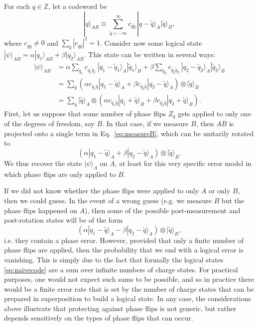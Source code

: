\documentclass[11pt,english]{article}
\newcommand{\ket}[1]{|#1\rangle}
\begin{document}
For each $q \in \mathbb{Z}$, let a codeword be
\begin{equation} \label{eq:naivecode}
\ket{q}_{AB} \equiv \sum_{\tilde q = -\infty}^{\infty} c_{q \tilde q} \, \ket{q-\tilde q}_A \ket{\tilde q}_B,
\end{equation}
where $c_{q\tilde q}\neq 0$ and $\sum_{\tilde q} |c_{q \tilde q}|^2 = 1$.
Consider now some logical state $\ket{\psi}_{AB} = \alpha \ket{q_1}_{AB} + \beta \ket{q_2}_{AB}$.
This state can be written in several ways:
\begin{align}
\ket{\psi}_{AB} &= \alpha \sum_{\tilde q_1} c_{q_1 \tilde q_1} \, \ket{q_1-\tilde q_1}_A \ket{\tilde q_1}_B + \beta \sum_{\tilde q_2} c_{q_2 \tilde q_2} \, \ket{q_2-\tilde q_2}_A \ket{\tilde q_2}_B \label{eq:totalstate} \\
&= \sum_{\tilde q} \left( \alpha c_{q_1 \tilde q} \ket{q_1 - \tilde q}_A + \beta c_{q_2 \tilde q} \ket{q_2 - \tilde q}_A \right) \otimes \ket{\tilde q}_B \label{eq:measureB} \\
&= \sum_{\tilde q} \ket{\tilde q}_A \otimes \left( \alpha c_{q_1 \tilde q} \ket{q_1 + \tilde q}_B + \beta c_{q_2 \tilde q} \ket{q_2 + \tilde q}_B \right).
\end{align}
First, let us suppose that some number of phase flips $Z_q$ gets applied to only one of the degrees of freedom, say $B$.
In that case, if we measure $B$, then $AB$ is projected onto a single term in Eq.~\eqref{eq:measureB}, which can be unitarily rotated to
\begin{equation} \label{eq:recovered}
(\alpha \ket{q_1 - \tilde q}_A + \beta \ket{q_2 - \tilde q}_A)\otimes\ket{\tilde q}_B.
\end{equation}
We thus recover the state $\ket{\psi}_A$ on $A$, at least for this very specific error model in which phase flips are only applied to $B$.

If we did not know whether the phase flips were applied to only $A$ or only $B$, then we could guess.
In the event of a wrong guess (e.g. we measure $B$ but the phase flips happened on $A$), then some of the possible post-measurement and post-rotation states will be of the form
\begin{equation}
(\alpha \ket{q_1 - \tilde q}_A - \beta \ket{q_2 - \tilde q}_A)\otimes\ket{\tilde q}_B,
\end{equation}
i.e. they contain a phase error.
However, provided that only a finite number of phase flips are applied, then the probability that we end with a logical error is vanishing.
This is simply due to the fact that formally the logical states \eqref{eq:naivecode} are a sum over infinite numbers of charge states.
For practical purposes, one would not expect such sums to be possible, and so in practice there would be a finite error rate that is set by the number of charge states that can be prepared in superposition to build a logical state.
In any case, the considerations above illustrate that protecting against phase flips is not generic, but rather depends sensitively on the types of phase flips that can occur.
\end{document}
